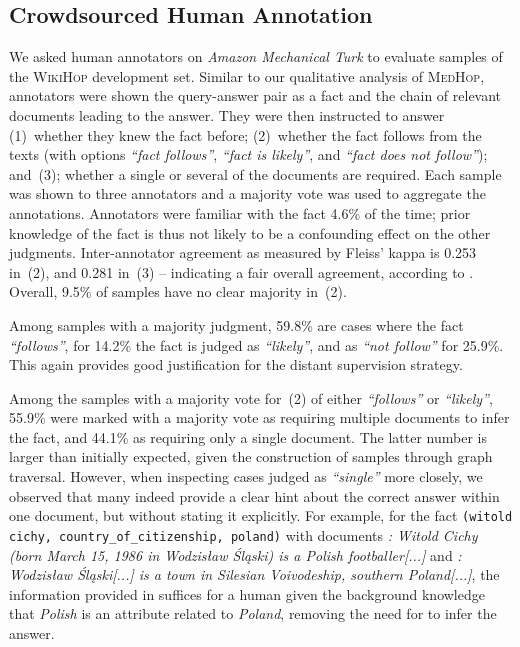 \documentclass[11pt,letterpaper]{article}
\newcommand{\MedHop}{\textsc{MedHop}\xspace}
\newcommand{\WikiHop}{\textsc{WikiHop}\xspace}
\begin{document}
\subsection{Crowdsourced Human Annotation}\label{sec:crowdsourcing}
We asked human annotators on \emph{Amazon Mechanical Turk} to evaluate samples of the \WikiHop development set.
Similar to our qualitative analysis of \MedHop, annotators were shown the query-answer pair as a fact and the chain of relevant documents leading to the answer.
They were then instructed to answer (1)~whether they knew the fact before; (2)~whether the fact follows from the texts (with options \emph{``fact follows''}, \emph{``fact is likely''}, and \emph{``fact does not follow''}); and~(3); whether a single or several of the documents are required.
Each sample was shown to three annotators and a majority vote was used to aggregate the annotations.
Annotators were familiar with the fact 4.6\% of the time; prior knowledge of the fact is thus not likely to be a confounding effect on the other judgments.
Inter-annotator agreement as measured by Fleiss' kappa is 0.253 in~(2), and 0.281 in~(3) -- indicating a fair overall agreement, according to .
Overall, 9.5\% of samples have no clear majority in~(2).




Among samples with a majority judgment, 59.8\% are cases where the fact \emph{``follows''}, for 14.2\% the fact is judged as \emph{``likely''}, and as \emph{``not follow''} for 25.9\%.
This again provides good justification for the distant supervision strategy.

Among the samples with a majority vote for~(2) of either \emph{``follows''} or \emph{``likely''}, 55.9\% were marked with a majority vote as requiring multiple documents to infer the fact, and 44.1\% as requiring only a single document.
The latter number is larger than initially expected, given the construction of samples through graph traversal.
However, when inspecting cases judged as \emph{``single''} more closely, we observed that many indeed provide a clear hint about the correct answer within one document, but without stating it explicitly.
For example, for the fact \texttt{\smaller(witold cichy, country\_of\_citizenship, poland)} with documents \emph{: Witold Cichy (born March 15, 1986 in Wodzisław Śląski) is a Polish footballer[...]} and \emph{: Wodzisław Śląski[...] is a town in Silesian Voivodeship, southern Poland[...]}, the information provided in  suffices for a human given the background knowledge that \emph{Polish} is an attribute related to \emph{Poland}, removing the need for  to infer the answer.
\end{document}
